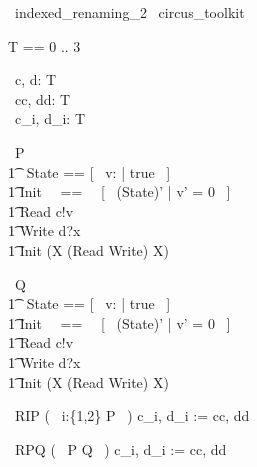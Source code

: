 \begin{zsection}
  \SECTION\ indexed\_renaming\_2 \parents\ circus\_toolkit
\end{zsection}

\begin{zed}
	T == 0 .. 3 
\end{zed}

\begin{circus}
	\circchannel\ c, d: T \\
	\circchannel\ cc, dd: T \cross \nat \\
	\circchannel\ c\_i, d\_i: T \cross \nat \\
\end{circus}

\begin{circus}
    \circprocess\ P \circdef \circbegin \\
        \t1 \circstate\ State == [~ v: \nat | true ~] \\
        \t1 Init ~~==~~ [~ (State)' | v' = 0 ~] \\
        \t1 Read \circdef c!v \then \Skip \\
        \t1 Write \circdef d?x \then \Skip \\
        \t1 \circspot \lschexpract Init \rschexpract \circseq (\circmu X \circspot (Read \extchoice Write) \circseq X) \\ 
	\circend
\end{circus}

\begin{circus}
    \circprocess\ Q \circdef \circbegin \\
        \t1 \circstate\ State == [~ v: \nat | true ~] \\
        \t1 Init ~~==~~ [~ (State)' | v' = 0 ~] \\
        \t1 Read \circdef c!v \then \Skip \\
        \t1 Write \circdef d?x \then \Skip \\
        \t1 \circspot \lschexpract Init \rschexpract \circseq (\circmu X \circspot (Read \extchoice Write) \circseq X) \\ 
	\circend
\end{circus}

\begin{circus}
    \circprocess\ RIP \circdef (~ i:\{1,2\} \circindex P ~) \lcircrename c\_i, d\_i := cc, dd \rcircrename \\
\end{circus}

\begin{circus}
    \circprocess\ RPQ \circdef (~ P \circseq Q ~) \lcircrename c\_i, d\_i := cc, dd \rcircrename \\
\end{circus}
